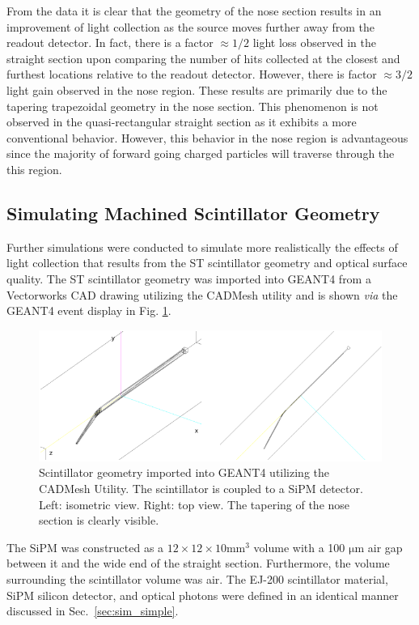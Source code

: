 From the data it is clear that the geometry of the nose section results in an improvement of light collection as the source moves further away from the readout detector.  In fact, there is a factor $\approx 1/2$ light loss observed in the straight section upon comparing the number of hits collected at the closest and furthest locations relative to the readout detector.  However, there is factor $\approx 3/2$ light gain observed in the nose region.  These results are primarily due to the tapering trapezoidal geometry in the nose section.  This phenomenon is not observed in the quasi-rectangular straight section as it exhibits a more conventional behavior. However, this behavior in the nose region is advantageous since the majority of forward going charged particles will traverse through the this region.

\subsection{Simulating Machined Scintillator Geometry} \label{sec:sim_mach}

Further simulations were conducted to simulate more realistically the effects of light collection that results from the ST scintillator geometry and optical surface quality.  The ST scintillator geometry was imported into GEANT4 from a Vectorworks CAD drawing utilizing the CADMesh utility \cite{cadmesh_g4} and is shown \textit{via} the GEANT4 event display in Fig. \ref{fig:pk_cadmesh}.
	\begin{figure}[!htb]
	\centering
	\includegraphics[width=1.0\columnwidth]{simulation/figs/pk_cadmesh}
	\caption{Scintillator geometry imported into GEANT4 utilizing the CADMesh Utility.  The scintillator is  coupled to a SiPM detector.  Left: isometric view.  Right: top view.  The tapering of the nose section is clearly visible.}
	\label{fig:pk_cadmesh}
	\end{figure}
The SiPM was constructed as a $12 \times 12 \times 10 \mathrm{mm^{3}}$ volume with a 100 $\mathrm{\mu m}$ air gap between it and the wide end of the straight section.  Furthermore, the volume surrounding the scintillator volume was air.  The EJ-200 scintillator material, SiPM silicon detector, and optical photons were defined in an identical manner discussed in Sec.~\ref{sec:sim_simple}.

